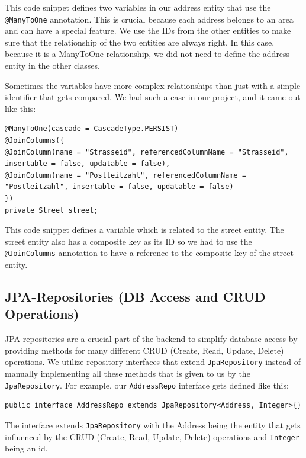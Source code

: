     This code snippet defines two variables in our address entity that use the \texttt{@ManyToOne} annotation. This is crucial because each address belongs to an area and can have a special feature. We use the IDs from the other entities to make sure that the relationship of the two entities are always right. In this case, because it is a ManyToOne relationship, we did not need to define the address entity in the other classes. \newline

    Sometimes the variables have more complex relationships than just with a simple identifier that gets compared. We had such a case in our project, and it came out like this: 
    \lstset{style=java, caption=Complex ManyToOne Variable}
    \begin{verbatim}
@ManyToOne(cascade = CascadeType.PERSIST)
@JoinColumns({
@JoinColumn(name = "Strasseid", referencedColumnName = "Strasseid", insertable = false, updatable = false),
@JoinColumn(name = "Postleitzahl", referencedColumnName = "Postleitzahl", insertable = false, updatable = false)
})
private Street street;                   
    \end{verbatim} 
    This code snippet defines a variable which is related to the street entity. The street entity also has a composite key as its ID so we had to use the \texttt{@JoinColumns} annotation to have a reference to the composite key of the street entity. 

    \subsection{JPA-Repositories (DB Access and CRUD Operations)}
    JPA repositories are a crucial part of the backend to simplify database access by providing methods for many different CRUD (Create, Read, Update, Delete) operations. We utilize repository interfaces that extend \texttt{JpaRepository} instead of manually implementing all these methods that is given to us by the \texttt{JpaRepository}. For example, our \texttt{AddressRepo} interface gets defined like this:  \newline
    \lstset{style=java, caption=AddressRepo Interface}
    \begin{verbatim}
public interface AddressRepo extends JpaRepository<Address, Integer>{}          
    \end{verbatim} 
    The interface extends \texttt{JpaRepository} with the Address being the entity that gets influenced by the CRUD (Create, Read, Update, Delete) operations and \texttt{Integer} being an id. \newline

